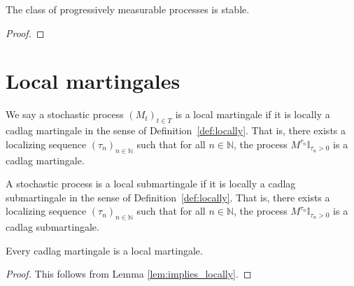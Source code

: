 \begin{lemma}\label{lem:isStable_isStronglyProgressive}
  \leanok
The class of progressively measurable processes is stable.
\end{lemma}

\begin{proof}\leanok
\end{proof}





\section{Local martingales}

\begin{definition}\label{def:IsLocalMartingale}
  \leanok
  We say a stochastic process $(M_t)_{t \in T}$ is a local martingale if it is locally a cadlag martingale in the sense of
  Definition~\ref{def:locally}. That is, there exists a localizing sequence $(\tau_n)_{n \in \mathbb{N}}$ such that for all $n \in \mathbb{N}$, the process $M^{\tau_n}\mathbb{I}_{\tau_n > 0}$ is a cadlag martingale.
\end{definition}


\begin{definition}\label{def:IsLocalSubmartingale}
  \leanok
A stochastic process is a local submartingale if it is locally a cadlag submartingale in the sense of Definition~\ref{def:locally}.
That is, there exists a localizing sequence $(\tau_n)_{n \in \mathbb{N}}$ such that for all $n \in \mathbb{N}$, the process $M^{\tau_n}\mathbb{I}_{\tau_n > 0}$ is a cadlag submartingale.
\end{definition}


\begin{lemma}\label{lem:Martingale.IsLocalMartingale}
  \leanok
Every cadlag martingale is a local martingale.
\end{lemma}

\begin{proof}\leanok
This follows from Lemma \ref{lem:implies_locally}.
\end{proof}


